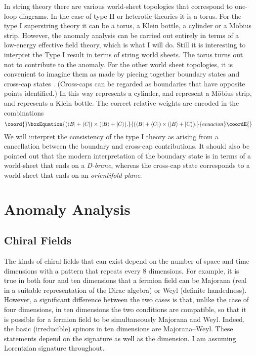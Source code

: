 \documentclass[a4paper,12pt]{article}
\begin{document}
In string theory there are various world-sheet topologies that
correspond to one-loop diagrams. In the case of  type II or
heterotic theories it is a torus. For the type I superstring
theory it can be a torus, a Klein bottle, a cylinder or a M\"obius
strip. However, the anomaly analysis can be carried out entirely
in terms of a low-energy effective field theory, which is what I
will do. Still it is interesting to interpret the Type I result in
terms of string world sheets. The torus turns out not to
contribute to the anomaly. For the other world sheet topologies,
it is convenient to imagine them as made by piecing together
boundary states \coordHE{} and cross-cap states \coordHE{}. (Cross-caps can
be regarded as boundaries that have opposite points identified.)
In this way \coordHE{} represents a cylinder, 
\coordHE{} and \coordHE{}
represent a M\"obius strip, and \coordHE{} represents a Klein
bottle. The correct relative weights are encoded in the
combinations
\begin{equation}\coord{}\boxEquation{
(\langle B| + \langle C|) \times (|B\rangle  + |C\rangle).
}{
(\langle B| + \langle C|) \times (|B\rangle  + |C\rangle).
}{ecuacion}\coordE{}\end{equation}
We will interpret the consistency of the \coordHE{} type I theory as
arising from a cancellation between the boundary and cross-cap
contributions. It should also be pointed out that the modern
interpretation of the boundary state is in terms of a world-sheet
that ends on a {\it D-brane}, whereas the cross-cap state
corresponds to a world-sheet that ends on an {\it orientifold
plane}.

\section{Anomaly Analysis}
\subsection{Chiral Fields}
The kinds of chiral fields that can exist depend on the number of
space and time dimensions with a pattern that repeats every 8
dimensions. For example, it is true in both four and ten
dimensions that a fermion field can be Majorana (real in a
suitable representation of the Dirac algebra) or Weyl (definite
handedness). However, a significant difference between the two
cases is that, unlike the case of four dimensions,
in ten dimensions the two conditions are compatible,
so that it is possible for a fermion field to be simultaneously
Majorana and Weyl. Indeed, the basic (irreducible) spinors in ten
dimensions are Majorana--Weyl. These statements depend on the
signature as well as the dimension. I am assuming Lorentzian
signature throughout.
\end{document}
